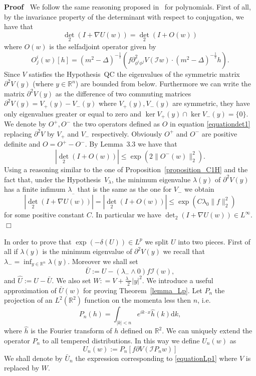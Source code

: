 \documentclass[a4paper,10pt]{article}
\newcommand{\assign}{:=}
\newcommand{\mathd}{\mathrm{d}}
\newenvironment{proof}{\noindent\textbf{Proof\ }}{\hspace*{\fill}$\Box$\medskip}
\begin{document}
\begin{proof}
  We follow the same reasoning proposed in~{\cite{Klein1984}} for polynomials.
  First of all, by the invariance property of the determinant with respect to
  conjugation, we have that
  \[ \det_2 (I + \nabla U (w)) = \det_2 (I + O (w)) \]
  where $O (w)$ is the selfadjoint operator given by
  \begin{equation}
    O^i_j (w) [h] = (m^2 - \Delta)^{- \frac{1}{2}} (f \partial_{\phi^i
    \phi^j}^2 V (\mathcal{I}w) \cdot (m^2 - \Delta)^{- \frac{1}{2}} h) .
    \label{equationdet1}
  \end{equation}
  Since $V$ satisfies the Hypothesis~QC the eigenvalues of the symmetric
  matrix $\partial^2 V (y)$ (where $y \in \mathbb{R}^n$) are bounded from
  below. Furthermore we can write the matrix $\partial^2 V (y)$ as the
  difference of two commuting matrices $\partial^2 V (y) = V_+ (y) - V_- (y)$
  where $V_+ (y), V_- (y)$ are symmetric, they have only eigenvalues greater
  or equal to zero and $\ker V_+ (y) \cap \ker V_- (y) = \{ 0 \}$. We denote
  by $O^+, O^-$ the two operators defined as $O$ in equation
  {\eqref{equationdet1}} replacing $\partial^2 V$ by $V_+$ and $V_-$
  respectively. Obviously $O^+$ and $O^-$ are positive definite and $O = O^+ -
  O^-$. By Lemma~3.3 {\cite{Klein1984}} we have that
  \[ | \det_2 (I + O (w)) | \leqslant \exp (2 \| O^- (w) \|^2_2) . \]
  Using a reasoning similar to the one of Proposition~\ref{proposition_C1H}
  and the fact that, under the Hypothesis~$V_{\lambda}$, the minimum
  eigenvalue $\lambda (y)$ of $\partial^2 V (y)$ has a finite infimum
  $\lambda_{_-}$ that is the same as the one for $V_-$ we obtain
  \[ | \det_2 (I + \nabla U (w)) | = | \det_2 (I + O (w)) | \leqslant \exp (C
     \lambda_0 \| f \|_2^2) \]
  for some positive constant $C$. In particular we have $\det_2 (I + \nabla U
  (w)) \in L^{\infty} .$
\end{proof}

In order to prove that $\exp (- \delta (U)) \in L^p$ we split $U$ into two
pieces. First of all if $\lambda (y)$ is the minimum eigenvalue of $\partial^2
V (y)$ we recall that $\lambda_- = \inf_{y \in \mathbb{R}^n} \lambda (y)$.
Moreover we shall set
\[ \bar{U} \assign U - (\lambda_- \wedge 0) f\mathcal{I} (w), \]
and $\hat{U} \assign U - \bar{U}$. We also set $W : = V + \frac{\lambda_-}{2}
| y |^2$. We introduce a useful approximation of $\bar{U} (w)$ for proving
Theorem~\ref{lemma_Lp}. Let $P_n$ the projection of an $L^2 (\mathbb{R}^2)$
function on the momenta less then $n$, i.e.
\[ P_n (h) = \int_{| k | < n} e^{i k \cdot x} \hat{h} (k) \mathd k, \]
where $\hat{h}$ is the Fourier transform of $h$ defined on $\mathbb{R}^2$. We
can uniquely extend the operator $P_n$ to all tempered distributions. In this
way we define $U_n (w)$ as
\begin{equation}
  U_n (w) \assign P_n [f \partial V (\mathcal{I}P_n w)]  \label{equationLp1}
\end{equation}
We shall denote by $\bar{U}_n$ the expression corresponding to
{\eqref{equationLp1}} where $V$ is replaced by $W$.
\end{document}
